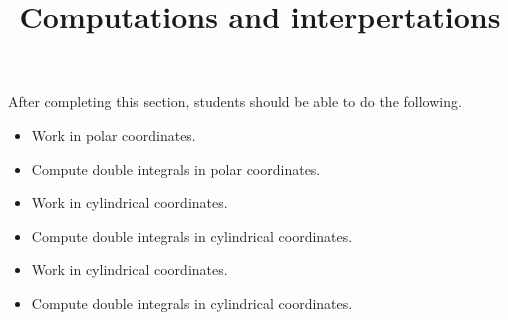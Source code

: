 \documentclass{ximera}
\title{Computations and interpertations}
\begin{document}
\begin{abstract}
\end{abstract}
\maketitle

\begin{sectionOutcomes}

After completing this section, students should be able to do the following.

\begin{itemize}
\item Work in polar coordinates.
\item Compute double integrals in polar coordinates.
\item Work in cylindrical coordinates.
\item Compute double integrals in cylindrical coordinates.
\item Work in cylindrical coordinates.
\item Compute double integrals in cylindrical coordinates.
\end{itemize}

\end{sectionOutcomes}
\end{document}
